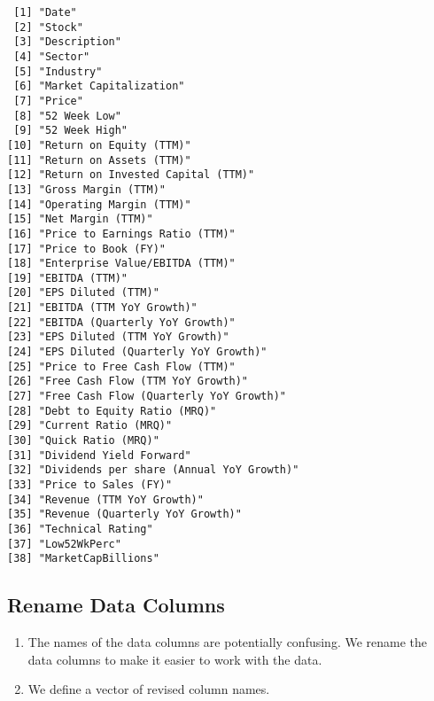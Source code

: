 \documentclass[
  letterpaper,
  DIV=11,
  numbers=noendperiod]{scrreport}
\begin{document}
\begin{verbatim}
 [1] "Date"                                   
 [2] "Stock"                                  
 [3] "Description"                            
 [4] "Sector"                                 
 [5] "Industry"                               
 [6] "Market Capitalization"                  
 [7] "Price"                                  
 [8] "52 Week Low"                            
 [9] "52 Week High"                           
[10] "Return on Equity (TTM)"                 
[11] "Return on Assets (TTM)"                 
[12] "Return on Invested Capital (TTM)"       
[13] "Gross Margin (TTM)"                     
[14] "Operating Margin (TTM)"                 
[15] "Net Margin (TTM)"                       
[16] "Price to Earnings Ratio (TTM)"          
[17] "Price to Book (FY)"                     
[18] "Enterprise Value/EBITDA (TTM)"          
[19] "EBITDA (TTM)"                           
[20] "EPS Diluted (TTM)"                      
[21] "EBITDA (TTM YoY Growth)"                
[22] "EBITDA (Quarterly YoY Growth)"          
[23] "EPS Diluted (TTM YoY Growth)"           
[24] "EPS Diluted (Quarterly YoY Growth)"     
[25] "Price to Free Cash Flow (TTM)"          
[26] "Free Cash Flow (TTM YoY Growth)"        
[27] "Free Cash Flow (Quarterly YoY Growth)"  
[28] "Debt to Equity Ratio (MRQ)"             
[29] "Current Ratio (MRQ)"                    
[30] "Quick Ratio (MRQ)"                      
[31] "Dividend Yield Forward"                 
[32] "Dividends per share (Annual YoY Growth)"
[33] "Price to Sales (FY)"                    
[34] "Revenue (TTM YoY Growth)"               
[35] "Revenue (Quarterly YoY Growth)"         
[36] "Technical Rating"                       
[37] "Low52WkPerc"                            
[38] "MarketCapBillions"                      
\end{verbatim}

\hypertarget{rename-data-columns}{%
\subsection{Rename Data Columns}\label{rename-data-columns}}

\begin{enumerate}
\def\labelenumi{\arabic{enumi}.}
\item
  The names of the data columns are potentially confusing. We rename the
  data columns to make it easier to work with the data.
\item
  We define a vector of revised column names.
\end{enumerate}
\end{document}
